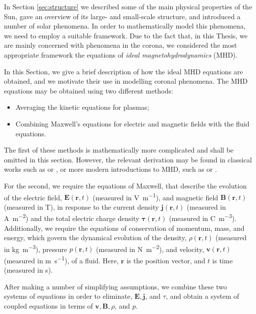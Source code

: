 In Section \ref{sec:structure} we described some of the main physical properties of the Sun, gave an overview of its large- and small-scale structure, and introduced a number of solar phenomena.
In order to mathematically model this phenomena, we need to employ a suitable framework.
Due to the fact that, in this Thesis, we are mainly concerned with phenomena in the corona, we considered the most appropriate framework the equations of \emph{ideal magnetohydrodynamics} (MHD).

In this Section, we give a brief description of how the ideal MHD equations are obtained, and we motivate their use in modelling coronal phenomena.
The MHD equations may be obtained using two different methods:
\begin{itemize}
\item Averaging the kinetic equations for plasmas;
\item Combining Maxwell's equations for electric and magnetic fields with the fluid equations.
\end{itemize}
The first of these methods is mathematically more complicated and shall be omitted in this section.
However, the relevant derivation may be found in classical works such as \cite{Braginskii1965} or \cite{Chapman1970}, or more modern introductions to MHD, such as \cite{Goossens2003} or \cite{Goedbloed2004}.

For the second, we require the equations of Maxwell, that describe the evolution of the electric field, $\mathbf E(\mathbf{r}, t)$ (measured in \si{V.m^{-1}}), and magnetic field $\mathbf B(\mathbf{r}, t)$ (measured in \si{T}), in response to the current density $\mathbf j(\mathbf{r}, t)$ (measured in \si{A.m^{-2}}) and the total electric charge density $\mathbf \tau(\mathbf{r}, t)$ (measured in \si{C.m^{-3}}).
Additionally, we require the equations of conservation of momentum, mass, and energy, which govern the dynamical evolution of the density, $\rho(\mathbf{r}, t)$ (measured in \si{kg.m^{-3}}), pressure $p(\mathbf{r}, t)$ (measured in \si{N.m^{-2}}), and velocity, $\mathbf{v}(\mathbf{r}, t)$ (measured in \si{m.s^{-1}}), of a fluid.
Here, $\mathbf{r}$ is the position vector, and $t$ is time (measured in \si{s}).

After making a number of simplifying assumptions, we combine these two systems of equations in order to eliminate, $\mathbf{E}, \mathbf{j}$, and $\tau$, and obtain a system of coupled equations in terms of $\mathbf{v}, \mathbf{B}, \rho$, and $p$.

